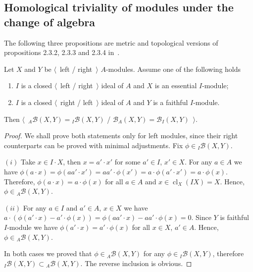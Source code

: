 
\subsection{
    Homological triviality of modules under the change of algebra}\label{
SubSectionHomologicalTrivialityOfModulesUnderChangeOfAlgebra}

The following three propositions are metric and topological versions of
propositions 2.3.2, 2.3.3 and 2.3.4 in~\cite{RamsHomPropSemgroupAlg}.

\begin{proposition}\label{MorphCoincide} Let $X$ and $Y$ be $\langle$~left /
right~$\rangle$ $A$-modules. Assume one of the following holds

\begin{enumerate}[label = (\roman*)]
    \item $I$ is a closed $\langle$~left / right~$\rangle$ ideal of $A$ and $X$ is an
    essential $I$-module;

    \item $I$ is a closed $\langle$~right / left~$\rangle$ ideal of $A$ and $Y$ is a
    faithful $I$-module. 
\end{enumerate}

Then $\langle$~${}_A\mathcal{B}(X,Y)={}_I\mathcal{B}(X,Y)$ /
$\mathcal{B}_A(X,Y)=\mathcal{B}_I(X,Y)$~$\rangle$.
\end{proposition}
\begin{proof} We shall prove both statements only for left modules, since their
right counterparts can be proved with minimal adjustments. 
Fix $\phi\in{}_I\mathcal{B}(X,Y)$.

$(i)$ Take $x\in I\cdot X$, then $x=a'\cdot x'$ for some $a'\in I$, $x'\in X$.
For any $a\in A$ we have $\phi(a\cdot x)=\phi(aa'\cdot
x')=aa'\cdot\phi(x')=a\cdot\phi(a'\cdot x')=a\cdot\phi(x)$. Therefore,
$\phi(a\cdot x)=a\cdot\phi(x)$ for all $a\in A$ 
and $x\in \operatorname{cl}_X(IX)=X$. Hence, $\phi\in {}_A\mathcal{B}(X,Y)$.

$(ii)$ For any $a\in I$ and $a'\in A$, $x\in X$ we have $a\cdot(\phi(a'\cdot
x)-a'\cdot\phi(x))=\phi(aa'\cdot x)-aa'\cdot\phi(x)=0$. Since $Y$ is faithful
$I$-module we have $\phi(a'\cdot x)=a'\cdot \phi(x)$ for all $x\in X$, 
$a'\in A$. Hence, $\phi\in{}_A\mathcal{B}(X,Y)$.

In both cases we proved that $\phi\in{}_A\mathcal{B}(X,Y)$ for any
$\phi\in{}_I\mathcal{B}(X,Y)$, 
therefore ${}_I\mathcal{B}(X,Y)\subset {}_A\mathcal{B}(X,Y)$. 
The reverse inclusion is obvious.
\end{proof}

